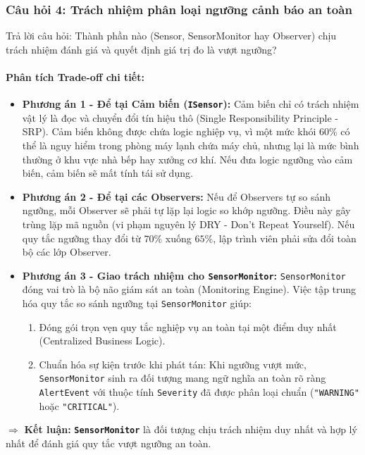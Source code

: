 \documentclass[11pt,a4paper]{article}
\begin{document}
\subsubsection{Câu hỏi 4: Trách nhiệm phân loại ngưỡng cảnh báo an toàn}
Trả lời câu hỏi: Thành phần nào (Sensor, SensorMonitor hay Observer) chịu trách nhiệm đánh giá và quyết định giá trị đo là vượt ngưỡng?

\paragraph{Phân tích Trade-off chi tiết:}
\begin{itemize}[itemsep=1.5pt]
    \item \textbf{Phương án 1 - Để tại Cảm biến (\texttt{ISensor}):} Cảm biến chỉ có trách nhiệm vật lý là đọc và chuyển đổi tín hiệu thô (Single Responsibility Principle - SRP). Cảm biến không được chứa logic nghiệp vụ, vì một mức khói $60\%$ có thể là nguy hiểm trong phòng máy lạnh chứa máy chủ, nhưng lại là mức bình thường ở khu vực nhà bếp hay xưởng cơ khí. Nếu đưa logic ngưỡng vào cảm biến, cảm biến sẽ mất tính tái sử dụng.
    \item \textbf{Phương án 2 - Để tại các Observers:} Nếu để Observers tự so sánh ngưỡng, mỗi Observer sẽ phải tự lặp lại logic so khớp ngưỡng. Điều này gây trùng lặp mã nguồn (vi phạm nguyên lý DRY - Don't Repeat Yourself). Nếu quy tắc ngưỡng thay đổi từ $70\%$ xuống $65\%$, lập trình viên phải sửa đổi toàn bộ các lớp Observer.
    \item \textbf{Phương án 3 - Giao trách nhiệm cho \texttt{SensorMonitor}:} \texttt{SensorMonitor} đóng vai trò là bộ não giám sát an toàn (Monitoring Engine). Việc tập trung hóa quy tắc so sánh ngưỡng tại \texttt{SensorMonitor} giúp:
    \begin{enumerate}
        \item Đóng gói trọn vẹn quy tắc nghiệp vụ an toàn tại một điểm duy nhất (Centralized Business Logic).
        \item Chuẩn hóa sự kiện trước khi phát tán: Khi ngưỡng vượt mức, \texttt{SensorMonitor} sinh ra đối tượng mang ngữ nghĩa an toàn rõ ràng \texttt{AlertEvent} với thuộc tính \texttt{Severity} đã được phân loại chuẩn (\texttt{"WARNING"} hoặc \texttt{"CRITICAL"}).
    \end{enumerate}
\end{itemize}
$\Rightarrow$ \textbf{Kết luận:} \textbf{\texttt{SensorMonitor}} là đối tượng chịu trách nhiệm duy nhất và hợp lý nhất để đánh giá quy tắc vượt ngưỡng an toàn.
\end{document}
